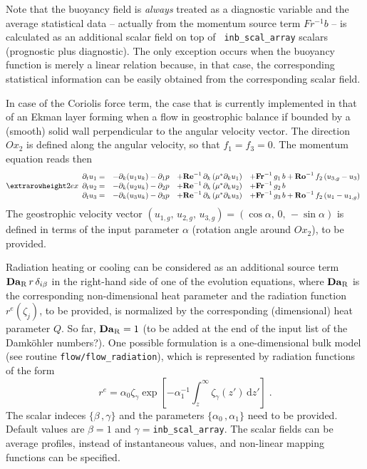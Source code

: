 Note that the buoyancy field is {\it always} treated as a diagnostic variable
and the average statistical data -- actually from the momentum source term
$Fr^{-1}b$ -- is calculated as an additional scalar field on top of {\tt
  inb\_scal\_array} scalars (prognostic plus diagnostic). The only exception
occurs when the buoyancy function is merely a linear relation because, in that
case, the corresponding statistical information can be easily obtained from the
corresponding scalar field.

In case of the Coriolis force term, the case that is currently implemented in
that of an Ekman layer forming when a flow in geostrophic balance if bounded by
a (smooth) solid wall perpendicular to the angular velocity vector. The
direction $Ox_2$ is defined along the angular velocity, so that $f_1=f_3=0$. The
momentum equation reads then
\begin{equation}
\setlength{\extrarowheight}{2ex}
\begin{array}{rlll}
  \partial_t  u_1 =& 
  -\partial_k ( u_1 u_k ) -\partial_1 p &
  +\mathrm{\bf Re}^{-1}\,\partial_k  \left( \mu^{*} \partial_k u_1\right) &
  +\mathrm{\bf Fr}^{-1}\, g_1\,b+\mathrm{\bf Ro}^{-1}\,f_2\,(u_{3,g}-u_3) \\
  \partial_t  u_2 =& 
  -\partial_k ( u_2 u_k ) -\partial_2 p &
  +\mathrm{\bf Re}^{-1}\,\partial_k  \left( \mu^{*} \partial_k u_2\right) &
  +\mathrm{\bf Fr}^{-1}\, g_2\,b \\
  \partial_t  u_3 =& 
  -\partial_k ( u_3 u_k ) -\partial_3 p &
  +\mathrm{\bf Re}^{-1}\,\partial_k  \left( \mu^{*} \partial_k u_3\right) &
  +\mathrm{\bf Fr}^{-1}\, g_3\,b+\mathrm{\bf Ro}^{-1}\,f_2\,(u_1-u_{1,g}) 
\end{array}
\end{equation}
The geostrophic velocity vector $(u_{1,g},\,u_{2,g},\,u_{3,g}) =
(\cos\alpha,\,0,\,-\sin\alpha)$ is defined in terms of the input parameter
$\alpha$ (rotation angle around $Ox_2$), to be provided.

Radiation heating or cooling can be considered as an additional source term
$\mathrm{\bf Da}_\mathrm{R}\,r\,\delta_{i\beta}$ in the right-hand side of one
of the evolution equations, where $\mathrm{\bf Da}_\mathrm{R}$ is the
corresponding non-dimensional heat parameter and the radiation function
$r^e(\zeta_j)$, to be provided, is normalized by the corresponding (dimensional)
heat parameter $Q$. So far, $\mathrm{\bf Da}_\mathrm{R}=1$ (to be added at the
end of the input list of the Damk{\"o}hler numbers?). One possible formulation
is a one-dimensional bulk model (see routine {\tt flow/flow\_radiation}), which
is represented by radiation functions of the form
\begin{equation}
r^e=\alpha_0 \zeta_{\gamma}\exp\left[
-\alpha_1^{-1}\int_z^\infty\zeta_{\gamma}(z')\,\mathrm{d}z'\right] \;.
\end{equation}
The scalar indeces $\{\beta\,,\gamma\}$ and the parameters $\{\alpha_0\,,\alpha_1\}$ need to be
provided. Default values are $\beta=1$ and $\gamma=${\tt inb\_scal\_array}. The scalar fields can be average profiles,
instead of instantaneous values, and non-linear mapping functions can be
specified.
